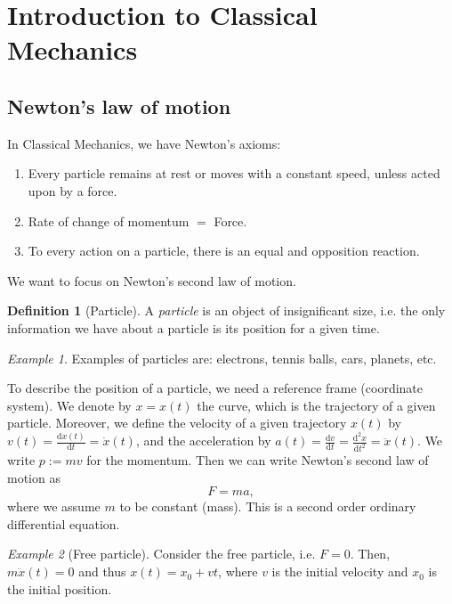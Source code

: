 \documentclass[12pt]{amsart}
\numberwithin{equation}{section}
\theoremstyle{plain}
\theoremstyle{definition}
\newtheorem{defn}{Definition}[subsection]
\theoremstyle{remark}
\newtheorem{ex}{Example}[subsection]
\newcommand{\dd}{{\mathrm{d}}}
\begin{document}



\section{Introduction to Classical Mechanics}
\subsection{Newton's law of motion} In Classical Mechanics, we have Newton's axioms:
\begin{enumerate}
\item{Every particle remains at rest or moves with a constant speed, unless acted upon by a force.}
\item{Rate of change of momentum $=$ Force.}
\item{To every action on a particle, there is an equal and opposition reaction.}
\end{enumerate}

We want to focus on Newton's second law of motion. 
\begin{defn}[Particle]
A \emph{particle} is an object of insignificant size, i.e. the only information we have about a particle is its position for a given time.
\end{defn}
\begin{ex}
Examples of particles are: electrons, tennis balls, cars, planets, etc.
\end{ex}

To describe the position of a particle, we need a reference frame (coordinate system). We denote by $x=x(t)$ the curve, which is the trajectory of a given particle. Moreover, we define the velocity of a given trajectory $x(t)$ by $v(t)=\frac{\dd x(t)}{\dd t}=\dot{x}(t)$, and the acceleration by $a(t)=\frac{\dd v}{\dd t}=\frac{\dd^2x}{\dd t^2}=\ddot{x}(t)$. We write $p:=mv$ for the momentum. Then we can write Newton's second law of motion as 
\begin{equation}
\label{second_law}
F=ma,
\end{equation}
where we assume $m$ to be constant (mass). This is a second order ordinary differential equation. 

\begin{ex}[Free particle]
Consider the free particle, i.e. $F=0$. Then, $m\ddot{x}(t)=0$ and thus $x(t)=x_0+v t$, where $v$ is the initial velocity and $x_0$ is the initial position.
\end{ex}
\end{document}
